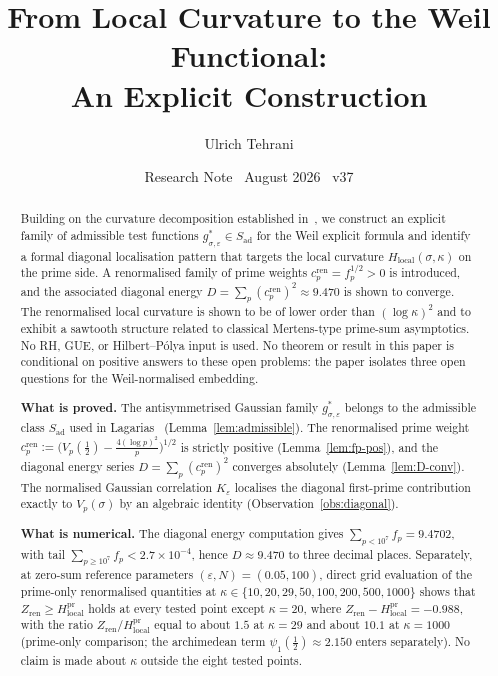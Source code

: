 \documentclass[11pt]{article}
\title{\vspace{-1.5em}\bfseries
From Local Curvature to the Weil Functional:\\[0.4em]
\large An Explicit Construction}
\author{Ulrich Tehrani}
\date{Research Note \textperiodcentered\ August 2026
      \textperiodcentered\ v37}
\newcommand{\Hlocal}{H_{\mathrm{local}}}
\newcommand{\Sad}{S_{\mathrm{ad}}}
\newcommand{\cren}{c_p^{\mathrm{ren}}}
\newcommand{\Zren}{Z_{\mathrm{ren}}}
\begin{document}
\maketitle

\begin{abstract}
Building on the curvature decomposition established
in~\cite{Paper1}, we construct an explicit family of admissible
test functions $g^*_{\sigma,\varepsilon}\in\Sad$ for the Weil
explicit formula and identify a formal diagonal localisation
pattern that targets the local curvature
$\Hlocal(\sigma,\kappa)$ on the prime side.
A renormalised family of prime weights
$\cren=f_p^{1/2}>0$ is introduced, and the associated diagonal
energy $D=\sum_p (\cren)^2\approx 9.470$ is shown to converge.
The renormalised local curvature is shown to be of lower order
than $(\log\kappa)^2$ and to exhibit a sawtooth structure related
to classical Mertens-type prime-sum asymptotics.
No RH, GUE, or Hilbert--P\'olya input is used.
No theorem or result in this paper is conditional on
positive answers to these open problems: the paper isolates three open
questions for the Weil-normalised embedding.

\textbf{What is proved.}
The antisymmetrised Gaussian family $g^*_{\sigma,\varepsilon}$
belongs to the admissible class $\Sad$ used in
Lagarias~\cite{Lagarias} (Lemma~\ref{lem:admissible}).
The renormalised prime weight
$\cren := \bigl(V_p(\tfrac12)-\tfrac{4(\log p)^2}{p}\bigr)^{1/2}$
is strictly positive (Lemma~\ref{lem:fp-pos}), and the diagonal
energy series $D=\sum_p (\cren)^2$ converges absolutely
(Lemma~\ref{lem:D-conv}).
The normalised Gaussian correlation $K_\varepsilon$
localises the diagonal first-prime contribution exactly
to $V_p(\sigma)$ by an algebraic identity
(Observation~\ref{obs:diagonal}).

\textbf{What is numerical.}
The diagonal energy computation gives
$\sum_{p<10^7} f_p = 9.4702$, with tail
$\sum_{p\ge 10^7}f_p < 2.7\times 10^{-4}$, hence
$D\approx 9.470$ to three decimal places.
Separately, at zero-sum reference parameters
$(\varepsilon,N)=(0.05,100)$, direct grid evaluation of the
prime-only renormalised quantities at
$\kappa\in\{10,20,29,50,100,200,500,1000\}$ shows that
$\Zren\ge\Hlocal^{\mathrm{pr}}$ holds at every tested point
except $\kappa=20$,
where $\Zren-\Hlocal^{\mathrm{pr}}=-0.988$, with the ratio
$\Zren/\Hlocal^{\mathrm{pr}}$
equal to about $1.5$ at $\kappa=29$ and about $10.1$ at $\kappa=1000$
(prime-only comparison; the archimedean term
$\psi_1(\tfrac12)\approx 2.150$ enters separately).
No claim is made about $\kappa$ outside the eight tested points.


\end{abstract}
\end{document}
